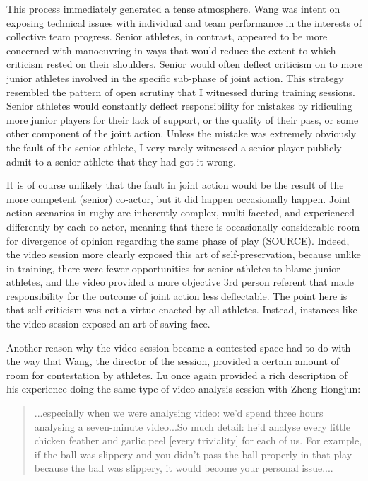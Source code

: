 \begin{CJK}{UTF8}{gbsn}
This process immediately generated a tense atmosphere.  Wang was intent on exposing technical issues with individual and team performance in the interests of collective team progress.  Senior athletes, in contrast, appeared to be more concerned with manoeuvring in ways that would reduce the extent to which criticism rested on their shoulders.  Senior would often deflect criticism on to more junior athletes involved in the specific sub-phase of joint action.    This strategy resembled the pattern of open scrutiny that I witnessed during training sessions.  Senior athletes would constantly deflect responsibility for mistakes by ridiculing more junior players for their lack of support, or the quality of their pass, or some other component of the joint action.  Unless the mistake was extremely obviously the fault of the senior athlete, I very rarely witnessed a senior player publicly admit to a senior athlete that they had got it wrong.

It is of course unlikely that the fault in joint action would be the result of the more competent (senior) co-actor, but it did happen occasionally happen.  Joint action scenarios in rugby are inherently complex, multi-faceted, and experienced differently by each co-actor, meaning that there is occasionally considerable room for divergence of opinion regarding the same phase of play (SOURCE).  Indeed, the video session more clearly exposed this art of self-preservation, because unlike in training, there were fewer opportunities for senior athletes to blame junior athletes, and the video provided a more objective 3rd person referent that made responsibility for the outcome of joint action less deflectable.  The point here is that self-criticism was not a virtue enacted by all athletes. Instead, instances like the video session exposed an art of saving face.


Another reason why the video session became a contested space had to do with the way that Wang, the director of the session, provided a certain amount of room for contestation by athletes. Lu once again provided a rich description of his experience doing the same type of video analysis session with Zheng Hongjun:

\begin{quotation}
  ...especially when we were analysing video: we'd spend three hours analysing a seven-minute video...So much detail: he'd analyse every little chicken feather and garlic peel [every triviality] for each of us. For example, if the ball was slippery and you didn't pass the ball properly in that play because the ball was slippery, it would become your personal issue....
\end{quotation}


\end{CJK}
